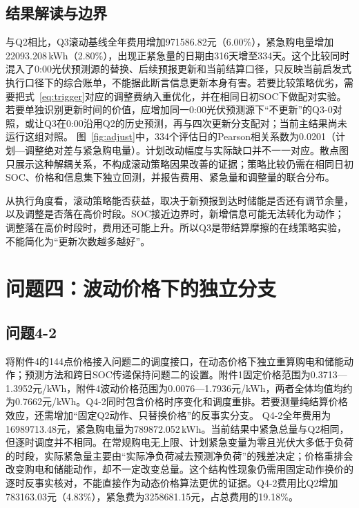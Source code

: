 \documentclass[UTF8,12pt,a4paper]{ctexart}
\begin{document}
\subsection{结果解读与边界}
与Q2相比，Q3滚动基线全年费用增加971586.82元（6.00\%），紧急购电量增加22093.208\,kWh（2.80\%），出现正紧急量的日期由316天增至334天。这个比较同时混入了0:00光伏预测源的替换、后续预报更新和当前结算口径，只反映当前启发式执行口径下的综合账单，不能据此断言信息更新本身有害。若要比较策略优劣，需要把式~\eqref{eq:trigger}对应的调整费纳入重优化，并在相同日初SOC下做配对实验。
若要单独识别更新时间的价值，应增加同一0:00光伏预测源下“不更新”的Q3-0对照，或让Q3在0:00沿用Q2的历史预测，再与四次更新分支配对；当前主结果尚未运行这组对照。
图~\ref{fig:adjust}中，334个评估日的Pearson相关系数为0.0201（计划—调整绝对差与紧急购电量）。计划改动幅度与实际缺口并不一一对应。散点图只展示这种解耦关系，不构成滚动策略因果改善的证据；策略比较仍需在相同日初SOC、价格和信息集下独立回测，并报告费用、紧急量和调整量的联合分布。

从执行角度看，滚动策略能否获益，取决于新预报到达时储能是否还有调节余量，以及调整是否落在高价时段。SOC接近边界时，新增信息可能无法转化为动作；调整落在高价时段时，费用还可能上升。所以Q3是带结算摩擦的在线策略实验，不能简化为“更新次数越多越好”。

\section{问题四：波动价格下的独立分支}
\subsection{问题4-2}
将附件4的144点价格接入问题二的调度接口，在动态价格下独立重算购电和储能动作；预测方法和跨日SOC传递保持问题二的设置。附件1固定价格范围为0.3713—1.3952元/kWh，附件4波动价格范围为0.0076—1.7936元/kWh，两者全体均值均约为0.7662元/kWh。Q4-2同时包含价格时序变化和调度重排。若要测量纯结算价格效应，还需增加“固定Q2动作、只替换价格”的反事实分支。
Q4-2全年费用为16989713.48元，紧急购电量为789872.052\,kWh。当前结果中紧急总量与Q2相同，但逐时调度并不相同。在常规购电无上限、计划紧急变量为零且光伏大多低于负荷的时段，实际紧急量主要由“实际净负荷减去预测净负荷”的残差决定；价格重排会改变购电和储能动作，却不一定改变总量。这个结构性现象仍需用固定动作换价的逐时反事实核对，不能直接作为动态价格算法更优的证据。Q4-2费用比Q2增加783163.03元（4.83\%），紧急费为3258681.15元，占总费用的19.18\%。
\end{document}
